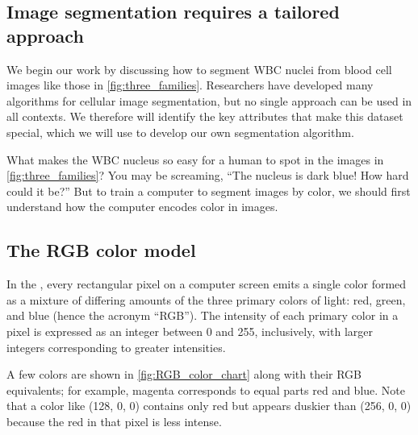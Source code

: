 \subsection{Image segmentation requires a tailored approach}

We begin our work by discussing how to segment WBC nuclei from blood cell images like those in \autoref{fig:three_families}. Researchers have developed many algorithms for cellular image segmentation, but no single approach can be used in all contexts. We therefore will identify the key attributes that make this dataset special, which we will use to develop our own segmentation algorithm.

What makes the WBC nucleus so easy for a human to spot in the images in \autoref{fig:three_families}? You may be screaming, ``The nucleus is dark blue! How hard could it be?'' But to train a computer to segment images by color, we should first understand how the computer encodes color in images.

\FloatBarrier
{}
\subsection{The RGB color model}

In the , every rectangular pixel on a computer screen emits a single color formed as a mixture of differing amounts of the three primary colors of light: red, green, and blue (hence the acronym ``RGB''). The intensity of each primary color in a pixel is expressed as an integer between 0 and 255, inclusively, with larger integers corresponding to greater intensities.

A few colors are shown in \autoref{fig:RGB_color_chart} along with their RGB equivalents; for example, magenta corresponds to equal parts red and blue. Note that a color like (128, 0, 0) contains only red but appears duskier than (256, 0, 0) because the red in that pixel is less intense.\\

